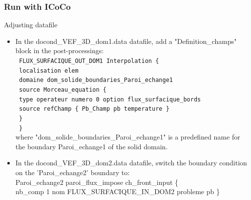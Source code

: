 \documentclass[10pt, hyperref={unicode=true,pdfusetitle, bookmarks=true,bookmarksnumbered=false,bookmarksopen=false, breaklinks=false,pdfborder={0 0 1},backref=true,colorlinks=true,linkcolor=darkblue,pageanchor, urlcolor=darkblue}]{beamer}
\begin{document}
\begin{frame}
\frametitle{Run with ICoCo}

\begin{block}{Adjusting datafile}
\begin{itemize}
\item In the docond\_VEF\_3D\_dom1.data datafile, add a "Definition\_champs" block in the post-processings:\\
\texttt{ \hspace{0.2cm} FLUX\_SURFACIQUE\_OUT\_DOM1 Interpolation \{             } \\
\texttt{ \hspace{0.5cm}    localisation elem                                     } \\
\texttt{ \hspace{0.5cm}    domaine dom\_solide\_boundaries\_Paroi\_echange1      } \\
\texttt{ \hspace{0.5cm}    source Morceau\_equation \{                           } \\
\texttt{ \hspace{0.7cm}        type operateur numero 0 option flux\_surfacique\_bords } \\
\texttt{ \hspace{0.7cm}        source refChamp \{ Pb\_Champ pb temperature \} } \\
\texttt{ \hspace{0.5cm}    \}                                                  } \\
\texttt{ \hspace{0.2cm} \}                                                     } \\
where "dom\_solide\_boundaries\_Paroi\_echange1" is a predefined name for the boundary Paroi\_echange1 of the solid domain.

\item In the docond\_VEF\_3D\_dom2.data datafile, switch the boundary condition on the 'Paroi\_echange2' boundary to:\\
Paroi\_echange2 paroi\_flux\_impose ch\_front\_input \{ \\ nb\_comp 1 nom FLUX\_SURFACIQUE\_IN\_DOM2 probleme pb \}
\end{itemize}
\end{block}

\end{frame}
\end{document}
